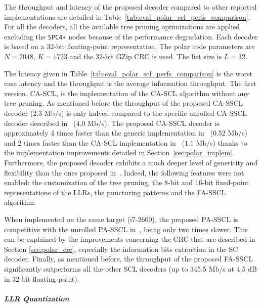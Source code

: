 The throughput and latency of the proposed decoder compared to other reported
implementations are detailed in Table~\ref{tab:eval_polar_scl_perfs_comparison}.
For all the decoders, all the available tree pruning optimizations are applied
excluding the \verb|SPC4+| nodes because of the performance degradation. Each
decoder is based on a 32-bit floating-point representation. The polar code
parameters are $N=2048$, $K=1723$ and the 32-bit GZip CRC is used. The list size
is $L=32$.

The latency given in Table~\ref{tab:eval_polar_scl_perfs_comparison} is the
worst case latency and the throughput is the average information throughput. The
first version, CA-SCL, is the implementation of the CA-SCL algorithm without any
tree pruning. As mentioned before the throughput of the proposed CA-SSCL decoder
($2.3$ Mb/s) is only halved compared to the specific unrolled CA-SSCL decoder
described in~\cite{Sarkis2016} (4.0 Mb/s). The proposed CA-SSCL decoder is
approximately 4 times faster than the generic implementation
in~\cite{Sarkis2014b} ($0.52$ Mb/s) and 2 times faster than the CA-SCL
implementation in~\cite{Shen2016} ($1.1$ Mb/s) thanks to the implementation
improvements detailed in Section~\ref{sec:polar_implem}. Furthermore, the
proposed decoder exhibits a much deeper level of genericity and flexibility than
the ones proposed in~\cite{Sarkis2014,Shen2016}. Indeed, the following features
were not enabled: the customization of the tree pruning, the 8-bit and 16-bit
fixed-point representations of the LLRs, the puncturing patterns and the FA-SSCL
algorithm.

When implemented on the same target (i7-2600), the proposed PA-SSCL is
competitive with the unrolled PA-SSCL in~\cite{Sarkis2016}, being only two times
slower. This can be explained by the improvements concerning the CRC that are
described in Section \ref{sec:polar_crc}, especially the information bits
extraction in the SC decoder. Finally, as mentioned before, the throughput of
the proposed FA-SSCL significantly outperforms all the other SCL decoders (up to
345.5 Mb/s at 4.5 dB in 32-bit floating-point).

\subparagraph{LLR Quantization}


